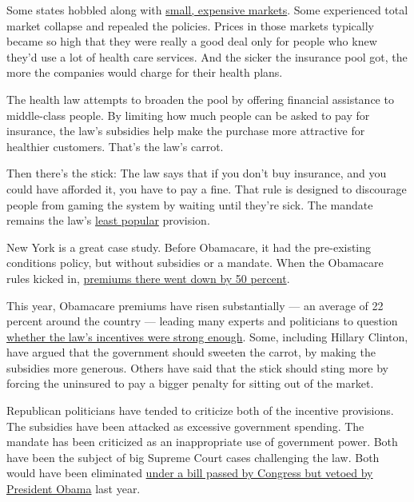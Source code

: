 Some states hobbled along with
\href{http://www.nytimes.com/2014/11/08/upshot/just-because-a-policy-causes-a-death-spiral-doesnt-mean-its-unsustainable.html}{small,
expensive markets}. Some experienced total market collapse and repealed
the policies. Prices in those markets typically became so high that they
were really a good deal only for people who knew they'd use a lot of
health care services. And the sicker the insurance pool got, the more
the companies would charge for their health plans.

The health law attempts to broaden the pool by offering financial
assistance to middle-class people. By limiting how much people can be
asked to pay for insurance, the law's subsidies help make the purchase
more attractive for healthier customers. That's the law's carrot.

Then there's the stick: The law says that if you don't buy insurance,
and you could have afforded it, you have to pay a fine. That rule is
designed to discourage people from gaming the system by waiting until
they're sick. The mandate remains the law's
\href{http://kff.org/health-reform/poll-finding/kaiser-health-policy-tracking-poll-december-2014/}{least
popular} provision.

New York is a great case study. Before Obamacare, it had the
pre-existing conditions policy, but without subsidies or a mandate. When
the Obamacare rules kicked in,
\href{http://www.nytimes.com/2013/07/17/health/health-plan-cost-for-new-yorkers-set-to-fall-50.html?pagewanted=all}{premiums
there went down by 50 percent}.

This year, Obamacare premiums have risen substantially --- an average of
22 percent around the country --- leading many experts and politicians
to question
\href{http://www.nytimes.com/2016/09/25/upshot/football-team-at-the-buffet-why-obamacare-markets-are-in-crisis.html}{whether
the law's incentives were strong enough}. Some, including Hillary
Clinton, have argued that the government should sweeten the carrot, by
making the subsidies more generous. Others have said that the stick
should sting more by forcing the uninsured to pay a bigger penalty for
sitting out of the market.

Republican politicians have tended to criticize both of the incentive
provisions. The subsidies have been attacked as excessive government
spending. The mandate has been criticized as an inappropriate use of
government power. Both have been the subject of big Supreme Court cases
challenging the law. Both would have been eliminated
\href{http://www.nytimes.com/2016/11/10/upshot/the-future-of-obamacare-looks-bleak.html}{under
a bill passed by Congress but vetoed by President Obama} last year.

